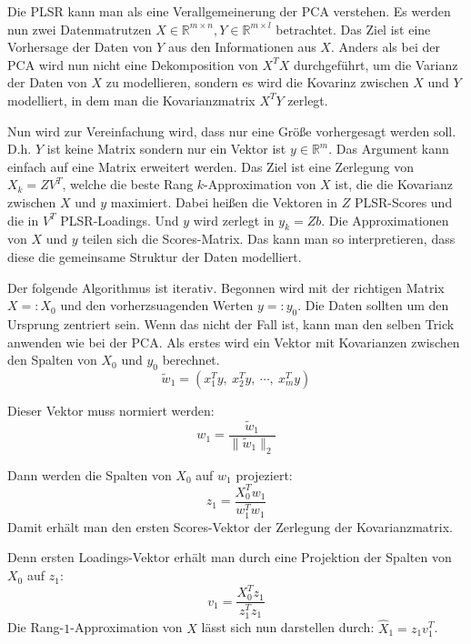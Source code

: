 \documentclass{article}
\newcommand{\R}[0]{\mathbb{R}}
\begin{document}
Die PLSR kann man als eine Verallgemeinerung der PCA verstehen. Es werden nun zwei Datenmatrutzen $X\in \R^{m \times n} ,Y \in \R^{m \times l}$ betrachtet.
Das Ziel ist eine Vorhersage der Daten von $Y$ aus den Informationen aus $X$. 
Anders als bei der PCA wird nun nicht eine Dekomposition von $X^TX$ durchgeführt, um die Varianz der Daten von $X$ zu modellieren, sondern es wird die Kovarinz
zwischen $X$ und $Y$ modelliert, in dem man die Kovarianzmatrix $X^TY$ zerlegt.

Nun wird zur Vereinfachung wird, dass nur eine Größe vorhergesagt werden soll.
D.h. $Y$ ist keine Matrix sondern nur ein Vektor ist $y \in \R^m$. Das Argument kann einfach auf eine Matrix erweitert werden.
Das Ziel ist eine Zerlegung von $X_k = ZV^T$, welche die beste Rang $k$-Approximation von $X$ ist, die die Kovarianz zwischen $X$ und $y$ maximiert.
Dabei heißen die Vektoren in $Z$ PLSR-Scores und die in $V^T$ PLSR-Loadings. Und $y$ wird zerlegt in $y_k = Zb$. 
Die Approximationen von $X$ und $y$ teilen sich die Scores-Matrix. Das kann man so interpretieren, dass diese die gemeinsame Struktur der Daten modelliert.

Der folgende Algorithmus ist iterativ. Begonnen wird mit der richtigen Matrix $X=:X_0$ und den vorherzsuagenden Werten $y=:y_0$.
Die Daten sollten um den Ursprung zentriert sein. Wenn das nicht der Fall ist, kann man den selben Trick anwenden wie bei der PCA.
Als erstes wird ein Vektor mit Kovarianzen zwischen den Spalten von $X_0$ und $y_0$ berechnet.
\begin{equation*}
    \tilde{w}_1 = (x_1^Ty, \: x_2^Ty, \: \cdots, \: x_m^Ty)
\end{equation*}

Dieser Vektor muss normiert werden:
\begin{equation*}
    w_1 = \frac{\tilde{w}_1}{\lVert \tilde{w}_1 \rVert_2}
\end{equation*}

Dann werden die Spalten von $X_0$ auf $w_1$ projeziert:
\begin{equation*}
    z_1 = \frac{X_0^Tw_1}{w_1^Tw_1}
\end{equation*}
Damit erhält man den ersten Scores-Vektor der Zerlegung der Kovarianzmatrix. 

Denn ersten Loadings-Vektor erhält man durch eine Projektion der Spalten von $X_0$ auf $z_1$:
\begin{equation*}
    v_1 = \frac{X_0^Tz_1}{z_1^Tz_1}
\end{equation*}
Die Rang-$1$-Approximation von $X$ lässt sich nun darstellen durch: $\hat{X}_1 = z_1v_1^T$.
\end{document}
